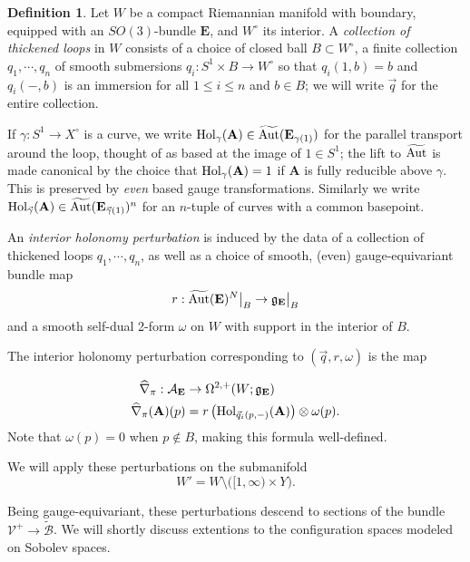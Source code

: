 \documentclass{memo-l}
\theoremstyle{definition}
\newtheorem{definition}[theorem]{Definition}
\theoremstyle{remark}
\numberwithin{section}{chapter}
\numberwithin{equation}{chapter}
\begin{document}
\begin{definition}\label{ThickLoop}Let $W$ be a compact Riemannian manifold with boundary, equipped with an $SO(3)$-bundle $\mathbf{E}$, and $W^\circ$ its interior. A \emph{collection of thickened loops} in $W$ consists of a choice of closed ball $B \subset W^\circ$, a finite collection $q_1, \cdots, q_n$ of smooth submersions $q_i: S^1 \times B \to W^\circ$ so that $q_i(1, b) = b$ and $q_i(-, b)$ is an immersion for all $1 \leq i \leq n$ and $b \in B$; we will write $\vec q$ for the entire collection. 

If $\gamma: S^1 \to X^\circ$ is a curve, we write $\textup{Hol}_\gamma(\mathbf{A}) \in \widetilde{\textup{Aut}}(\mathbf{E}_{\gamma(1)})$ for the parallel transport around the loop, thought of as based at the image of $1 \in S^1$; the lift to $\widetilde{\textup{Aut}}$ is made canonical by the choice that $\textup{Hol}_\gamma(\mathbf{A}) = 1$ if $\mathbf{A}$ is fully reducible above $\gamma$. This is preserved by \emph{even} based gauge transformations. Similarly we write $\textup{Hol}_{\vec \gamma}(\mathbf{A}) \in \widetilde{\textup{Aut}}(\mathbf{E}_{\vec \gamma(1)})^n$ for an $n$-tuple of curves with a common basepoint.

An \emph{interior holonomy perturbation} is induced by the data of a collection of thickened loops $q_1, \cdots, q_n$, as well as a choice of smooth, (even) gauge-equivariant bundle map 
$$r: \widetilde{\textup{Aut}}(\mathbf{E})^N\big|_B \to \mathfrak g_{\mathbf{E}}\big|_B$$ 
and a smooth self-dual 2-form $\omega$ on $W$ with support in the interior of $B$. 

The interior holonomy perturbation corresponding to $(\vec q, r, \omega)$ is the map 

\begin{align*}\widehat{\nabla}_\pi: \mathcal A_{\mathbf{E}} &\to \Omega^{2,+}(W; \mathfrak g_{\mathbf{E}})\\
\widehat{\nabla}_\pi(\mathbf{A})(p) &= r\left(\textup{Hol}_{\vec q_i(p, -)}(\mathbf{A})\right) \otimes \omega(p).\end{align*}
Note that $\omega(p) = 0$ when $p \not\in B$, making this formula well-defined.
\end{definition}

We will apply these perturbations on the submanifold $$W' = W \setminus \big([1,\infty) \times Y\big).$$

Being gauge-equivariant, these perturbations descend to sections of the bundle $\mathcal V^+ \to \widetilde{\mathcal B}$. We will shortly discuss extentions to the configuration spaces modeled on Sobolev spaces.
\end{document}
